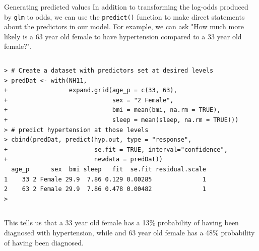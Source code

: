 \documentclass[table,smaller]{beamer}
\begin{document}
\begin{frame}[fragile,label=sec-4-4]{Generating predicted values}
 In addition to transforming the log-odds produced by \texttt{glm} to odds, we can use the \texttt{predict()} function to make direct statements about the predictors in our model. For example, we can ask "How much more likely is a 63 year old female to have hypertension compared to a 33 year old female?".

\vspace{-.5em}
\begin{columns}
\begin{block}{}
\begin{verbatim}
> # Create a dataset with predictors set at desired levels
> predDat <- with(NH11,
+                 expand.grid(age_p = c(33, 63),
+                             sex = "2 Female",
+                             bmi = mean(bmi, na.rm = TRUE),
+                             sleep = mean(sleep, na.rm = TRUE)))
> # predict hypertension at those levels
> cbind(predDat, predict(hyp.out, type = "response",
+                        se.fit = TRUE, interval="confidence",
+                        newdata = predDat))
  age_p      sex  bmi sleep   fit  se.fit residual.scale
1    33 2 Female 29.9  7.86 0.129 0.00285              1
2    63 2 Female 29.9  7.86 0.478 0.00482              1
>
\end{verbatim}
\end{block}
\end{columns}
\vspace{.5em}

This tells us that a 33 year old female has a 13\% probability of having been diagnosed with hypertension, while and 63 year old female has a 48\% probability of having been diagnosed.
\end{frame}
\end{document}
